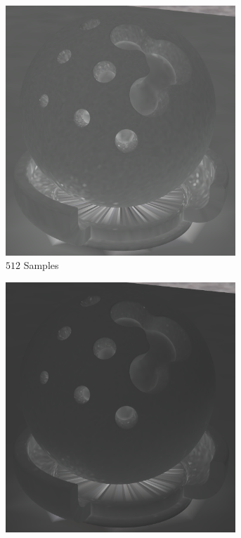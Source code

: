 		\begin{figure}[t]
			\begin{subfigure}[b]{0.33\textwidth}
				\center
				\includegraphics[width=0.95\textwidth]{pic/irr_est-rc-shaderball2-s512-err.png}
				\caption{$512$ Samples}
			\end{subfigure}
			\begin{subfigure}[b]{0.33\textwidth}
				\center
				\includegraphics[width=0.95\textwidth]{pic/irr_est-rc-shaderball2-s4096-err.png}

\end{subfigure}
\end{figure}
